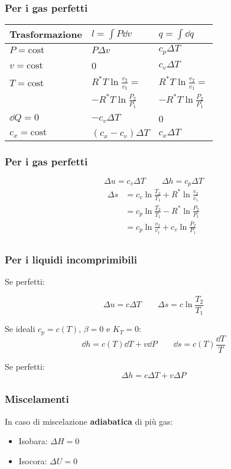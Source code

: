 \subsubsection{Per i gas perfetti}
\begin{tabular}{lll}
    \toprule
    Trasformazione & $l=\int P\dd{v}$ & $q = \int \dd{q}$ \\
    \midrule
    $P = \text{cost}$ & $P\Delta v$ & $c_p\Delta T$ \\
    $v = \text{cost}$ & 0 & $c_v\Delta T$ \\
    $T = \text{cost}$ & $R^*T\ln{\frac{v_2}{v_1}} =$ & $R^*T\ln{\frac{v_2}{v_1}} =$ \\
    & $-R^*T\ln{\frac{P_2}{P_1}}$ & $-R^*T\ln{\frac{P_2}{P_1}}$ \\
    $\dd{Q}=0$ & $-c_v\Delta T$ & 0 \\
    $c_x = \text{cost}$ & $(c_x-c_v)\Delta T$ & $c_x\Delta T$ \\
    \bottomrule
\end{tabular}

\subsubsection{Per i gas perfetti}
\[ \Delta u = c_v \Delta T \qquad \Delta h = c_p \Delta T \]
\begin{align*}
    \Delta s &= c_v \ln{\frac{T_2}{T_1}} + R^*\ln{\frac{v_2}{v_1}} \\
    &= c_p \ln{\frac{T_2}{T_1}} - R^*\ln{\frac{P_2}{P_1}} \\
    &= c_p \ln{\frac{v_2}{v_1}} + c_v\ln{\frac{P_2}{P_1}} \\
\end{align*}

\subsubsection{Per i liquidi incomprimibili}

Se perfetti:

\[ \Delta u = c \Delta T \qquad \Delta s = c \ln{\frac{T_2}{T_1}} \]

Se ideali $c_p = c(T)$, $\beta = 0$ e $K_T = 0$:
\[ \dd{h} = c(T)\dd{T} + v\dd{P} \qquad \dd{s} = c(T)\frac{\dd{T}}{T} \]

Se perfetti:
\[ \Delta h = c\Delta T + v \Delta P \]

\subsubsection{Miscelamenti}
In caso di miscelazione \textbf{adiabatica} di più gas:
\begin{itemize}
    \item Isobara: $\Delta H = 0$
    \item Isocora: $\Delta U = 0$
\end{itemize}

